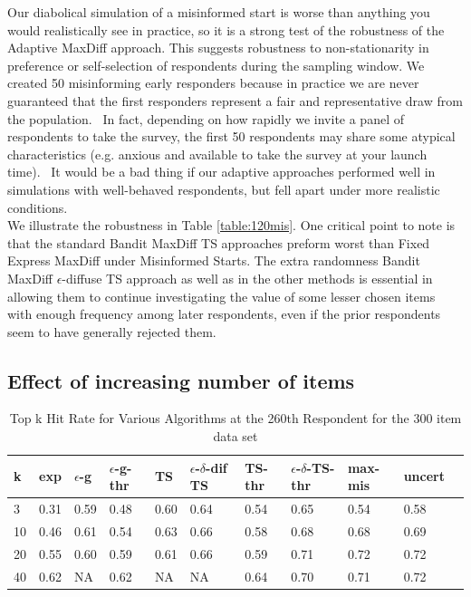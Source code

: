 \documentclass[a4paper,12pt]{article}
\newcommand{\fixedexpressS}{\textbf{exp}}
\newcommand{\egreedyS}{$\epsilon$-\textbf{g}}
\newcommand{\egreedythresS}{$\epsilon$-\textbf{g-thr}}
\newcommand{\misminS}{\textbf{max-mis}}
\newcommand{\tsS}{\textbf{TS} }
\newcommand{\edtsS}{$\epsilon$-$\delta$-\textbf{dif TS} }
\newcommand{\tsthresS}{\textbf{TS-thr} }
\newcommand{\edtsthresS}{$\epsilon$-$\delta$-\textbf{TS-thr} }
\newcommand{\uncertS}{\textbf{uncert} }
\begin{document}
Our diabolical simulation of a misinformed start is worse than anything you would realistically see in practice, so it is a strong test of the robustness of the Adaptive MaxDiff approach. This suggests robustness to non-stationarity in preference or self-selection of respondents during the sampling window. We created 50 misinforming early responders because in practice we are never guaranteed that the first responders represent a fair and representative draw from the population.  In fact, depending on how rapidly we invite a panel of respondents to take the survey, the first 50 respondents may share some atypical characteristics (e.g. anxious and available to take the survey at your launch time).  It would be a bad thing if our adaptive approaches performed well in simulations with well-behaved respondents, but fell apart under more realistic conditions. \\

We illustrate the robustness in Table \ref{table:120mis}. One critical point to note is that the standard Bandit MaxDiff TS approaches preform worst than Fixed Express MaxDiff under Misinformed Starts.  The extra randomness Bandit MaxDiff $\epsilon$-diffuse TS approach as well as in the other methods  is essential in allowing them to continue investigating the value of some lesser chosen items with enough frequency among later respondents, even if the prior respondents seem to have generally rejected them.

\subsection{Effect of increasing number of items}
\begin{table}
\begin{center}
\begin{tabular}{lllllllllll}
\hline   k &  \fixedexpressS & \egreedyS&\egreedythresS&\tsS&\edtsS&\tsthresS&\edtsthresS& \misminS& \uncertS \\ \hline 
3&   0.31 &   0.59 & 0.48 & 0.60 &  0.64 & 0.54 & 0.65 & 0.54 &   0.58 \\ 
10 & 0.46 &   0.61 & 0.54 & 0.63  & 0.66 & 0.58 & 0.68 & 0.68  &   0.69 \\ 
20 & 0.55 &   0.60 & 0.59 &  0.61 & 0.66 & 0.59 & 0.71 &       0.72 &   0.72\\ 
40 & 0.62 &   NA & 0.62 & NA &  NA & 0.64 & 0.70 & 0.71 & 0.72 \end{tabular}
\end{center}
\caption{Top k Hit Rate for Various Algorithms at the 260th Respondent for the 300 item data set}
\label{table:300at260}
\end{table}
\end{document}
